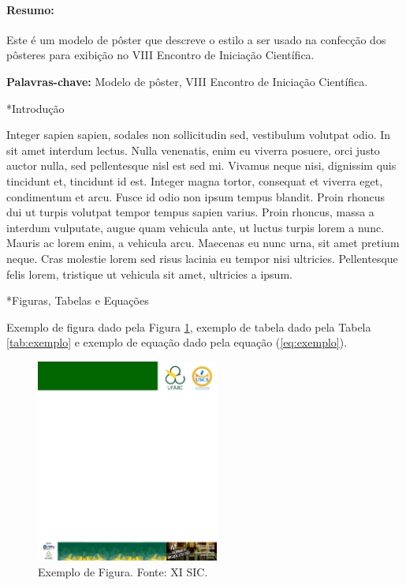 \documentclass[plainsections,36pt]{sciposter}
\makeatletter
\newcommand{\largo}{\fontsize{36}{40}\selectfont }
\renewcommand\section{\@startsection {section}{1}{\z@}{-1ex \@plus -0.5ex \@minus -.1ex}{0.8ex \@plus.1ex}{\normalfont\largo\bfseries}}
\makeatother
\begin{document}
\vspace{1.2cm}
\begin{multicols}{2}
\paragraph{Resumo:} Este é um modelo de pôster que descreve o estilo a ser usado na confecção dos pôsteres para exibição no VIII Encontro de Iniciação Científica.

\textbf{Palavras-chave:} Modelo de pôster, VIII Encontro de Iniciação Científica.

\section*{Introdução}

Integer sapien sapien, sodales non sollicitudin sed, vestibulum volutpat odio. In sit amet interdum lectus.
Nulla venenatis, enim eu viverra posuere, orci justo auctor nulla, sed pellentesque nisl est sed mi.
Vivamus neque nisi, dignissim quis tincidunt et, tincidunt id est. Integer magna tortor, consequat et viverra eget,
condimentum et arcu. Fusce id odio non ipsum tempus blandit. Proin rhoncus dui ut turpis volutpat tempor tempus sapien varius. 
Proin rhoncus, massa a interdum vulputate, augue quam vehicula ante, ut luctus turpis lorem a nunc.
Mauris ac lorem enim, a vehicula arcu. Maecenas eu nunc urna, sit amet pretium neque.
Cras molestie lorem sed risus lacinia eu tempor nisi ultricies.
Pellentesque felis lorem, tristique ut vehicula sit amet, ultricies a ipsum.

\section*{Figuras, Tabelas e Equações}

Exemplo de figura dado pela Figura \ref{fig:exemplo}, exemplo de tabela dado pela Tabela \ref{tab:exemplo} e exemplo de equação dado pela equação (\ref{eq:exemplo}).

\begin{figure}[htb]
\centering
\includegraphics[width=6cm]{poster-xi-sic.jpg}
\caption{Exemplo de Figura. Fonte: XI SIC.}
\label{fig:exemplo}
\end{figure}


\end{multicols}
\end{document}
